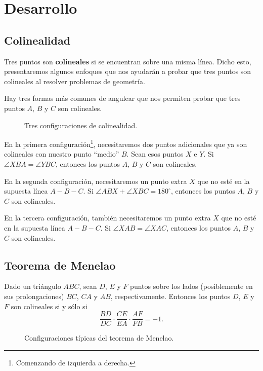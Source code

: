 \section{Desarrollo}



\subsection{Colinealidad}

\begin{figure}[H]
    \centering
    
\end{figure}

Tres puntos son \textbf{colineales} si se encuentran sobre una misma línea.
Dicho esto, presentaremos algunos enfoques que nos ayudarán a probar que tres puntos son colineales al resolver problemas de geometría.

Hay tres formas más comunes de angulear que nos permiten probar que tres puntos $A$, $B$ y $C$ son colineales.

\begin{figure}[H]
    \centering
    
    \caption{Tres configuraciones de colinealidad.}
\end{figure}

En la primera configuración\footnote{Comenzando de izquierda a derecha.}, necesitaremos dos puntos adicionales que ya son colineales con nuestro punto ``medio'' $B$.
Sean esos puntos $X$ e $Y$.
Si $\angle XBA = \angle YBC$, entonces los puntos $A$, $B$ y $C$ son colineales.

En la segunda configuración, necesitaremos un punto extra $X$ que no esté en la supuesta línea $A - B - C$.
Si $\angle ABX + \angle XBC = 180^\circ$, entonces los puntos $A$, $B$ y $C$ son colineales.

En la tercera configuración, también necesitaremos un punto extra $X$ que no esté en la supuesta línea $A - B - C$.
Si $\angle XAB = \angle XAC$, entonces los puntos $A$, $B$ y $C$ son colineales.

\subsection{Teorema de Menelao}

\begin{section-theorem.tcb}\label{menelaus-theorem}
    Dado un triángulo $ABC$, sean $D$, $E$ y $F$ puntos sobre los lados (posiblemente en sus prolongaciones) $BC$, $CA$ y $AB$, respectivamente.
    Entonces los puntos $D$, $E$ y $F$ son colineales si y sólo si
    \[
        \frac{BD}{DC} \cdot \frac{CE}{EA} \cdot \frac{AF}{FB} = -1.
    \]
\end{section-theorem.tcb}
\begin{figure}[H]
    \centering
    
    \caption{Configuraciones típicas del teorema de Menelao.}
\end{figure}

